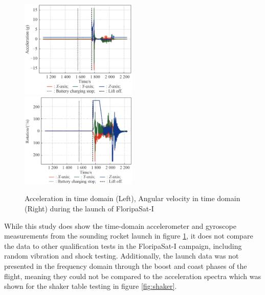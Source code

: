 \documentclass{report}
\begin{document}
\begin{figure}[H]
  \includegraphics[width=0.495\textwidth]{images/floripa-accel.png}
  \includegraphics[width=0.495\textwidth]{images/floripa-rot.png}
  \caption{Acceleration in time domain (Left), Angular velocity in time domain (Right) during the launch of FloripaSat-I \cite{9316404}}
  \label{fig:accel-rot}
\end{figure}

While this study does show the time-domain accelerometer and gyroscope measurements from the sounding rocket launch in figure \ref{fig:accel-rot}, it does not compare the data to other qualification tests in the FloripaSat-I campaign, including random vibration and shock testing. Additionally, the launch data was not presented in the frequency domain through the boost and coast phases of the flight, meaning they could not be compared to the acceleration spectra which was shown for the shaker table testing in figure \ref{fig:shaker}.
\end{document}
